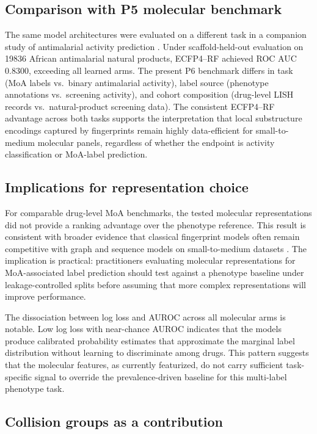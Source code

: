 \documentclass[11pt,a4paper]{article}
\begin{document}
\subsection{Comparison with P5 molecular benchmark}

The same model architectures were evaluated on a different task in a companion study of antimalarial activity prediction \citep{temgoua2027quantum}. Under scaffold-held-out evaluation on \num{19836} African antimalarial natural products, ECFP4--RF achieved ROC AUC \num{0.8300}, exceeding all learned arms. The present P6 benchmark differs in task (MoA labels vs.\ binary antimalarial activity), label source (phenotype annotations vs.\ screening activity), and cohort composition (drug-level LISH records vs.\ natural-product screening data). The consistent ECFP4--RF advantage across both tasks supports the interpretation that local substructure encodings captured by fingerprints remain highly data-efficient for small-to-medium molecular panels, regardless of whether the endpoint is activity classification or MoA-label prediction.

\subsection{Implications for representation choice}

For comparable drug-level MoA benchmarks, the tested molecular representations did not provide a ranking advantage over the phenotype reference. This result is consistent with broader evidence that classical fingerprint models often remain competitive with graph and sequence models on small-to-medium datasets \citep{guo_ding_2026,benchmark_pretrained_2025}. The implication is practical: practitioners evaluating molecular representations for MoA-associated label prediction should test against a phenotype baseline under leakage-controlled splits before assuming that more complex representations will improve performance.

The dissociation between log loss and AUROC across all molecular arms is notable. Low log loss with near-chance AUROC indicates that the models produce calibrated probability estimates that approximate the marginal label distribution without learning to discriminate among drugs. This pattern suggests that the molecular features, as currently featurized, do not carry sufficient task-specific signal to override the prevalence-driven baseline for this multi-label phenotype task.

\subsection{Collision groups as a contribution}
\end{document}
